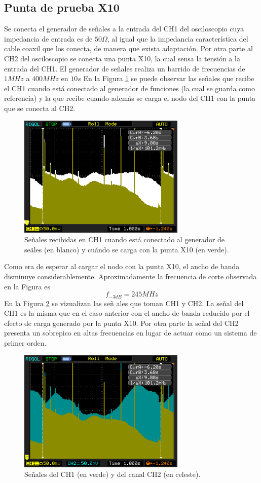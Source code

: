 \documentclass[a4paper,10pt]{article}
\begin{document}
		\subsection{Punta de prueba X10}
		Se conecta el generador de se\~nales a la entrada del CH1 del osciloscopio cuya impedancia de entrada es de $50 \Omega$, al igual que la impedancia caracter\'istica del cable coaxil que los conecta, de manera que exista adaptaci\'on. Por otra parte al CH2 del osciloscopio se conecta una punta X10, la cual sensa la tensi\'on a la entrada del CH1.
		El generador de se\~nales realiza un barrido de frecuencias de $1MHz$ a $400MHz$ en $10s$
		En la Figura \ref{img001} se puede observar las se\~nales que recibe el CH1 cuando est\'a conectado al generador de funciones (la cual se guarda como referencia) y la que recibe cuando adem\'as se carga el nodo del CH1 con la punta que se conecta al CH2.
		\begin{figure}[!htb]
			\centering
			\includegraphics[width=8cm]{Imagenes/Mediciones instrumentos/NewFile1.png}
			\caption{Se\~nales recibidas en CH1 cuando est\'a conectado al generador de se\~ales (en blanco) y cu\'ando se carga con la punta X10 (en verde).} \label{img001}
		\end{figure}
			
		Como era de esperar al cargar el nodo con la punta X10, el ancho de banda disminuye considerablemente. Aproximadamente la frecuencia de corte observada en la Figura es $$f_{-3dB}=245MHz$$
		En la Figura \ref{img000} se vizualizan las se\~n ales que toman CH1 y CH2. La se\~nal del CH1 es la misma que en el caso anterior con el ancho de banda reducido por el efecto de carga generado por la punta X10. Por otra parte la se\~nal del CH2 presenta un sobrepico en altas frecuencias en lugar de actuar como un sistema de primer orden.
		\begin{figure}[!htb]
			\centering
			\includegraphics[width=8cm]{Imagenes/Mediciones instrumentos/NewFile0.png}
			\caption{Se\~nales del CH1 (en verde) y del canal CH2 (en celeste).} \label{img000}
		\end{figure}
									
\end{document}
